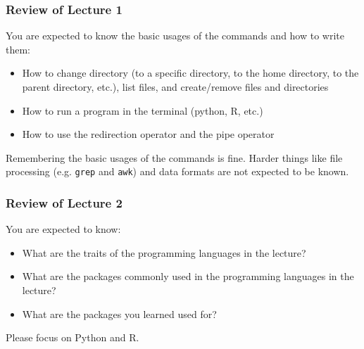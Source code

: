 \documentclass[10pt]{beamer}
\begin{document}
\begin{frame}
	\frametitle{Review of Lecture 1}

	You are expected to know the basic usages of the commands and how to write them:
	\begin{itemize}
		\item How to change directory (to a specific directory, to the home directory, to the parent directory, etc.), list files, and create/remove files and directories
		\item How to run a program in the terminal (python, R, etc.)
		\item How to use the redirection operator and the pipe operator
	\end{itemize}

	Remembering the basic usages of the commands is fine. Harder things like file processing (e.g. \texttt{grep} and \texttt{awk}) and data formats are not expected to be known.

\end{frame}

\begin{frame}
	\frametitle{Review of Lecture 2}

	You are expected to know:
	\begin{itemize}
		\item What are the traits of the programming languages in the lecture?
		\item What are the packages commonly used in the programming languages in the lecture?
		\item What are the packages you learned used for?
	\end{itemize}

	Please focus on Python and R.
\end{frame}
\end{document}
